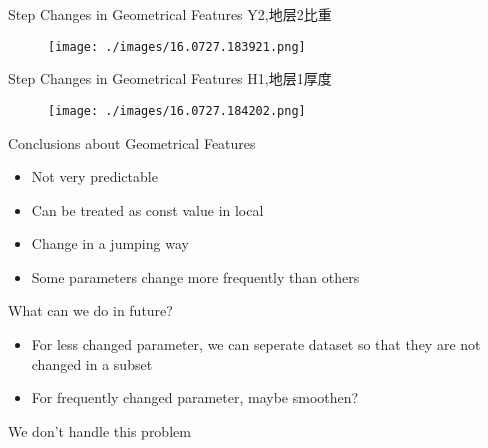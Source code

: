 \documentclass[bigger]{beamer}
\begin{document}
\begin{frame}[label=sec-3-8]{Step Changes in Geometrical Features}
Y2,地层2比重
\begin{figure}[htb]
\centering
\texttt{[image: ./images/16.0727.183921.png]}
\end{figure}
\end{frame}
\begin{frame}[label=sec-3-9]{Step Changes in Geometrical Features}
H1,地层1厚度
\begin{figure}[htb]
\centering
\texttt{[image: ./images/16.0727.184202.png]}
\end{figure}
\end{frame}
\begin{frame}[label=sec-3-10]{Conclusions about Geometrical Features}
\begin{itemize}
\item Not very predictable
\item Can be treated as const value in local
\item Change in a jumping way
\item Some parameters change more frequently than others
\end{itemize}
\begin{block}{What can we do in future?}
\begin{itemize}
\item For less changed parameter, we can seperate dataset so that they are
not changed in a subset
\item For frequently changed parameter, maybe smoothen?
\end{itemize}
\end{block}
We don't handle this problem
\end{frame}
\end{document}
